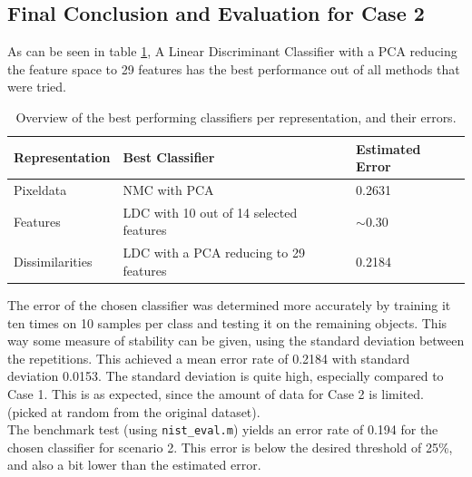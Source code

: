 \subsection{Final Conclusion and Evaluation for Case 2}
As can be seen in table \ref{tab:concase2}, A Linear Discriminant Classifier with a PCA reducing the feature space to 29 features has the best performance out of all methods that were tried.
\begin{table}[H]
	\centering
	\caption{Overview of the best performing classifiers per representation, and their errors.}
	\label{tab:concase2}
	\begin{tabular}{l|ll}
		Representation  & Best Classifier               & Estimated Error \\ \hline
		Pixeldata       & NMC with PCA &   0.2631        \\
		Features        & LDC with 10 out of 14 selected features                      & $\sim$0.30          \\
		Dissimilarities & LDC with a PCA reducing to 29 features                       &  0.2184        
	\end{tabular}
\end{table}
\noindent The error of the chosen classifier was determined more accurately by training it ten times on 10 samples per class and testing it on the remaining objects. This way some measure of stability can be given, using the standard deviation between the repetitions. This achieved a mean error rate of 0.2184 with standard deviation 0.0153. The standard deviation is quite high, especially compared to Case 1. This is as expected, since the amount of data for Case 2 is limited. (picked at random from the original dataset).\\
The benchmark test (using \texttt{nist\_eval.m}) yields an error rate of 0.194 for the chosen classifier for scenario 2. This error is below the desired threshold of 25\%, and also a bit lower than the estimated error.